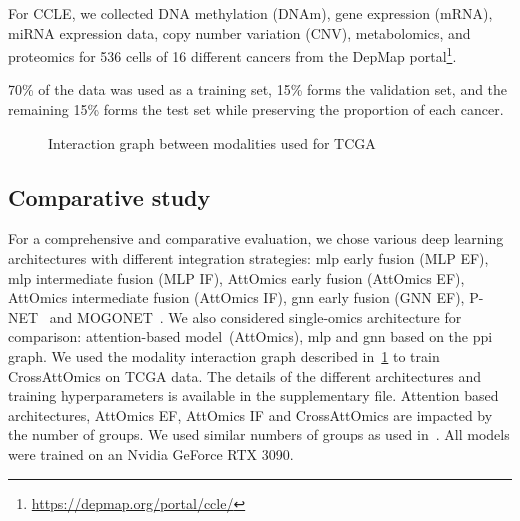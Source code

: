 \documentclass[../main.tex]{subfiles}
\begin{document}
     For CCLE, we collected DNA methylation (DNAm), gene expression (mRNA), miRNA expression data, copy number variation (CNV), metabolomics, and proteomics for 536 cells of 16 different cancers from the DepMap portal\footnote{\url{https://depmap.org/portal/ccle/}}.

     70\% of the data was used as a training set, 15\% forms the validation set, and the remaining 15\% forms the test set while preserving the proportion of each cancer.

     \begin{figure}[htbp]
         \small
         \centering
         \caption{Interaction graph between modalities used for TCGA}
         \label{fig:tcga_graph}
     \end{figure}

 \subsection{Comparative study}
     For a comprehensive and comparative evaluation, we chose various deep learning architectures with different integration strategies: \gls{mlp} early fusion (MLP EF), \gls{mlp} intermediate fusion (MLP IF), AttOmics early fusion (AttOmics EF), AttOmics intermediate fusion (AttOmics IF), \gls{gnn} early fusion (GNN EF), P-NET~\cite{PNet} and MOGONET~\cite{MOGONET}.
     We also considered single-omics architecture for comparison: attention-based model~(AttOmics), \gls{mlp} and \gls{gnn} based on the \gls{ppi} graph.
     We used the modality interaction graph described in~\cref{fig:tcga_graph} to train CrossAttOmics on TCGA data.
     The details of the different architectures and training hyperparameters is available in the supplementary file.
     Attention based architectures, AttOmics EF, AttOmics IF and CrossAttOmics are impacted by the number of groups.
     We used similar numbers of groups as used in~\cite{AttOmics}.
     All models were trained on an Nvidia GeForce RTX 3090.
\end{document}
